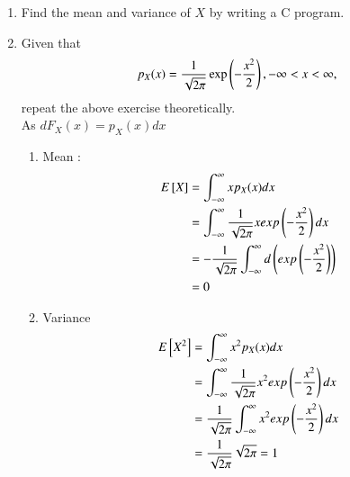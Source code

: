 \documentclass[journal,12pt,twocolumn]{IEEEtran}
\renewcommand\thesection{\arabic{section}}
\begin{document}
\begin{enumerate}[label=\thesection.\arabic*
,ref=\thesection.\theenumi]
What properties does the PDF have?
\\
\solution The PDF of $X$ is plotted in Fig. \ref{fig:gauss_pdf} using the code below
\begin{lstlisting}
wget https://github.com/HarshaVardhanReddyG/A1110_Assignment/blob/main/codes/pdf_gau_plot.py
\end{lstlisting}
\begin{figure}[ht!]
\centering
\texttt{[image: gauss\_pdf.pdf]}
\caption{The CDF of $X$}
\centering
\label{fig:gauss_pdf}
\end{figure}
\begin{enumerate}
    \item $\forall x \in \mathbf{R}$ $p(x)\ge 0$
    \item 
    \begin{align}
        \int_{-\infty}^\infty p(x)dx&=1
    \end{align}
\end{enumerate}

\item Find the mean and variance of $X$ by writing a C program.
\item Given that 
\begin{align}
p_{X}(x) = \frac{1}{\sqrt{2\pi}}\exp\left(-\frac{x^2}{2}\right), -\infty < x < \infty,
\end{align}
repeat the above exercise theoretically.\\
\solution As $dF_X(x)=p_X(x)dx$
\begin{enumerate}
\item Mean :
\begin{align}
E{}\left[X\right]&=\int_{-\infty}^{\infty}xp_X(x)dx \\
&=\int_{-\infty}^{\infty}\frac{1}{\sqrt{2\pi}}xexp\left(-\frac{x^2}{2}\right)dx \\
&=-\frac{1}{\sqrt{2\pi}}\int_{-\infty}^{\infty}d\left(exp\left(-\frac{x^2}{2}\right)\right) \\
&=0
\end{align}
\item Variance
\begin{align}
E {}\left[X^2\right]&=\int_{-\infty}^{\infty}x^2p_X(x)dx \\
&=\int_{-\infty}^{\infty}\frac{1}{\sqrt{2\pi}}x^2exp\left(-\frac{x^2}{2}\right)dx \\
&=\frac{1}{\sqrt{2\pi}}\int_{-\infty}^{\infty}x^2exp\left(-\frac{x^2}{2}\right)dx \\
&=\frac{1}{\sqrt{2\pi}}\sqrt{2\pi}=1
\end{align}
\end{enumerate}
\end{enumerate}
\end{document}
